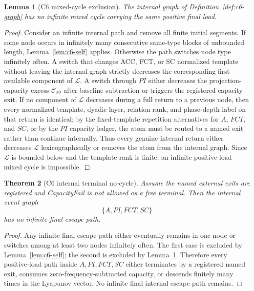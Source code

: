 \documentclass[11pt]{article}
\newtheorem{theorem}{Theorem}[section]
\newtheorem{lemma}[theorem]{Lemma}
\theoremstyle{definition}
\begin{document}
\begin{lemma}[C6 mixed-cycle exclusion]\label{lem:c6-mixed}
The internal graph of Definition~\ref{def:c6-graph} has no infinite mixed cycle carrying the same positive final load.
\end{lemma}
\begin{proof}
Consider an infinite internal path and remove all finite initial segments.  If some node occurs in infinitely many consecutive same-type blocks of unbounded length, Lemma~\ref{lem:c6-self} applies.  Otherwise the path switches node type infinitely often.  A switch that changes ACC, FCT, or SC normalized template without leaving the internal graph strictly decreases the corresponding first available component of $\mathcal L$.  A switch through $PI$ either decreases the projection-capacity excess $\mathcal C_{PI}$ after baseline subtraction or triggers the registered capacity exit.  If no component of $\mathcal L$ decreases during a full return to a previous node, then every normalized template, dyadic layer, relation rank, and phase-depth label on that return is identical; by the fixed-template repetition alternatives for $A$, $FCT$, and $SC$, or by the $PI$ capacity ledger, the atom must be routed to a named exit rather than continue internally.  Thus every genuine internal return either decreases $\mathcal L$ lexicographically or removes the atom from the internal graph.  Since $\mathcal L$ is bounded below and the template rank is finite, an infinite positive-load mixed cycle is impossible.
\end{proof}

\begin{theorem}[C6 internal terminal no-cycle]\label{thm:c6}
Assume the named external exits are registered and CapacityFail is not allowed as a free terminal.  Then the internal event graph
\[
  \{A,PI,FCT,SC\}
\]
has no infinite final escape path.
\end{theorem}
\begin{proof}
Any infinite final escape path either eventually remains in one node or switches among at least two nodes infinitely often.  The first case is excluded by Lemma~\ref{lem:c6-self}; the second is excluded by Lemma~\ref{lem:c6-mixed}.  Therefore every positive-load path inside $A,PI,FCT,SC$ either terminates by a registered named exit, consumes zero-frequency-subtracted capacity, or descends finitely many times in the Lyapunov vector.  No infinite final internal escape path remains.
\end{proof}
\end{document}
